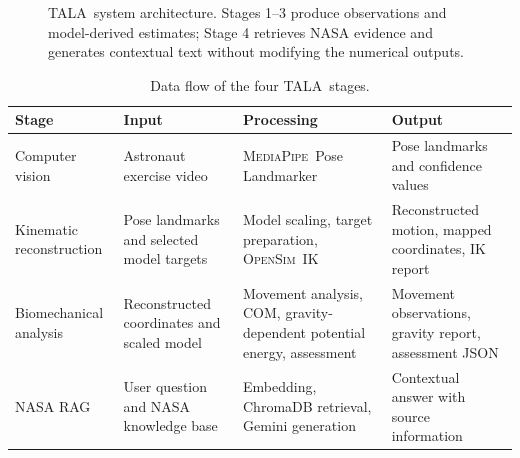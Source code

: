 \documentclass[11pt,a4paper]{article}
\newcommand{\TALA}{\textsc{TALA}}
\newcommand{\OpenSim}{\textsc{OpenSim}}
\newcommand{\MediaPipe}{\textsc{MediaPipe}}
\begin{document}
\begin{figure}[H]
\centering
{}
\caption{\TALA\ system architecture. Stages 1--3 produce observations and model-derived estimates; Stage 4 retrieves NASA evidence and generates contextual text without modifying the numerical outputs.}
\label{fig:architecture}
\end{figure}

\begin{table}[H]
\centering
\caption{Data flow of the four \TALA\ stages.}
\label{tab:stages}
\small
\begin{tabularx}{\linewidth}{>{\raggedright\arraybackslash}p{2.6cm} >{\raggedright\arraybackslash}X >{\raggedright\arraybackslash}X >{\raggedright\arraybackslash}X}
\toprule
\textbf{Stage} & \textbf{Input} & \textbf{Processing} & \textbf{Output}\\
\midrule
Computer vision & Astronaut exercise video & \MediaPipe\ Pose Landmarker & Pose landmarks and confidence values\\
Kinematic reconstruction & Pose landmarks and selected model targets & Model scaling, target preparation, \OpenSim\ IK & Reconstructed motion, mapped coordinates, IK report\\
Biomechanical analysis & Reconstructed coordinates and scaled model & Movement analysis, COM, gravity-dependent potential energy, assessment & Movement observations, gravity report, assessment JSON\\
NASA RAG & User question and NASA knowledge base & Embedding, ChromaDB retrieval, Gemini generation & Contextual answer with source information\\
\bottomrule
\end{tabularx}
\end{table}
\end{document}
